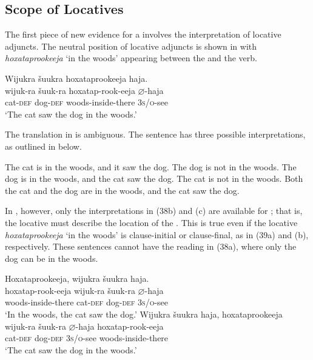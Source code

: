 \documentclass[output=paper]{LSP/langsci}
\begin{document}
\subsection{Scope of Locatives}

The first piece of new evidence for a  involves the interpretation of locative adjuncts. The neutral position of locative adjuncts is shown in  with \textit{hoxataprookeeja} `in the woods' appearing between the  and the verb.

\begin{exe}
\ex\label{ex:jrs:37} 
\glll Wijukra	\v{s}uukra		hoxataprookeeja		haja.\\
wijuk-ra	\v{s}uuk-ra		hoxatap-rook-eeja		$\varnothing$-haja \\
cat-\textsc{def}		dog-\textsc{def} 	woods-inside-there	\textsc{3s/o}-see \\
\trans `The cat saw the dog in the woods.' 
\end{exe}

The translation in  is ambiguous. The  sentence has three possible interpretations, as outlined in  below.

\begin{exe}
\ex\label{ex:jrs:38} 
\begin{xlist}
\ex The cat is in the woods, and it saw the dog. The dog is not in the woods. 
\ex The dog is in the woods, and the cat saw the dog. The cat is not in the woods.
\ex Both the cat and the dog are in the woods, and the cat saw the dog.
\end{xlist}
\end{exe}

In , however, only the interpretations in (38b) and (c) are available for ; that is, the locative  must describe the location of the . This is true even if the locative \textit{hoxataprookeeja} `in the woods' is clause-initial or clause-final, as in (39a) and (b), respectively. These sentences cannot have the reading in (38a), where only the dog can be in the woods.

\begin{exe}
\ex\label{ex:jrs:39}
\begin{xlist}
\ex 
\glll Hoxataprookeeja, 		wijukra	\v{s}uukra			haja.\\
hoxatap-rook-eeja		wijuk-ra	\v{s}uuk-ra		$\varnothing$-haja \\
	woods-inside-there 	cat-\textsc{def}		dog-\textsc{def}		\textsc{3s/o}-see \\
\trans `In the woods, the cat saw the dog.'
\ex 
\glll Wijukra	\v{s}uukra			haja,				hoxataprookeeja\\
wijuk-ra	\v{s}uuk-ra		$\varnothing$-haja			hoxatap-rook-eeja \\
	cat-\textsc{def}		dog-\textsc{def}		\textsc{3s/o}-see	woods-inside-there \\
\trans `The cat saw the dog in the woods.'
\end{xlist}
\end{exe}
	
\end{document}
